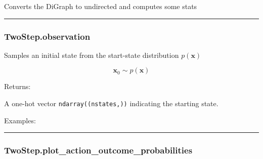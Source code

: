 Converts the DiGraph to undirected and computes some stats

\begin{center}\rule{0.5\linewidth}{\linethickness}\end{center}

\subsubsection{TwoStep.observation}\label{twostep.observation}

\begin{Shaded}
\begin{Highlighting}[]
\NormalTok{)}
\end{Highlighting}
\end{Shaded}

Samples an initial state from the start-state distribution
\(p(\mathbf x)\)

\[
\mathbf x_0 \sim p(\mathbf x)
\]

Returns:

A one-hot vector \texttt{ndarray((nstates,))} indicating the starting
state.

Examples:

\begin{Shaded}
\begin{Highlighting}[]
\OperatorTok{=}
\end{Highlighting}
\end{Shaded}

\begin{center}\rule{0.5\linewidth}{\linethickness}\end{center}

\subsubsection{TwoStep.plot\_action\_outcome\_probabilities}\label{twostep.plot_action_outcome_probabilities}

\begin{Shaded}
\begin{Highlighting}[]
\OperatorTok{=}\OperatorTok{=}\OperatorTok{=}\OperatorTok{=}\NormalTok{)}
\end{Highlighting}
\end{Shaded}

